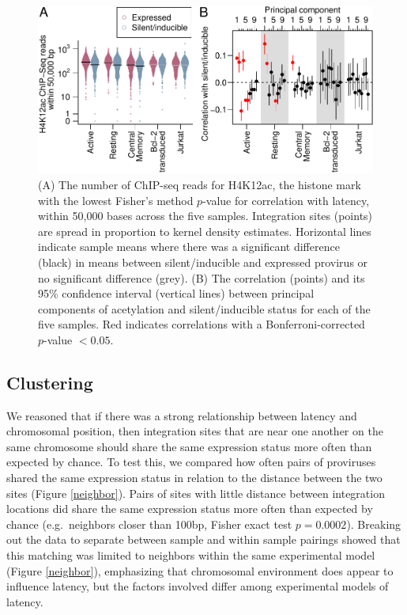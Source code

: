 \documentclass[../sherrill-Mix_thesis.tex]{subfiles}
\begin{document}
	\begin{figure}
		\centering
			\includegraphics[width=\textwidth]{acetylation.pdf} %
		\caption[Acetylation and latency]{(A) The number of ChIP-seq reads for H4K12ac, the histone mark with the lowest Fisher's method $p$-value for correlation with latency, within 50,000 bases across the five samples. Integration sites (points) are spread in proportion to kernel density estimates. Horizontal lines indicate sample means where there was a significant difference (black) in means between silent/inducible and expressed provirus or no significant difference (grey). (B) The correlation (points) and its 95\% confidence interval (vertical lines) between principal components of acetylation and silent/inducible status for each of the five samples. Red indicates correlations with a Bonferroni-corrected $p$-value $< 0.05$.}
		\label{acetylation}
	\end{figure}



	\subsection{Clustering}
	 We reasoned that if there was a strong relationship between latency and chromosomal position, then integration sites that are near one another on the same chromosome should share the same expression status more often than expected by chance. To test this, we compared how often pairs of proviruses shared the same expression status in relation to the distance between the two sites (Figure \ref{neighbor}). Pairs of sites with little distance between integration locations did share the same expression status more often than expected by chance (e.g.\  neighbors closer than 100bp, Fisher exact test $p=0.0002$). Breaking out the data to separate between sample and within sample pairings showed that this matching was limited to neighbors within the same experimental model (Figure \ref{neighbor}), emphasizing that chromosomal environment does appear to influence latency, but the factors involved differ among experimental models of latency. 
\end{document}
